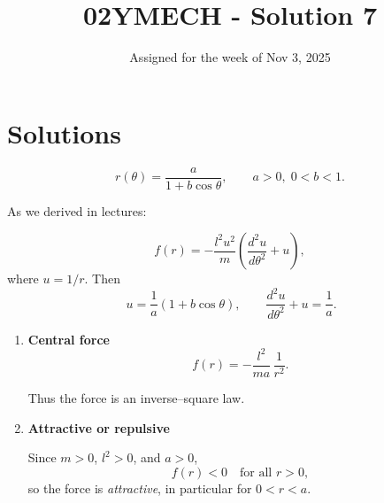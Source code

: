 \documentclass[12pt]{article}
\title{02YMECH - Solution 7}
\date{Assigned for the week of Nov 3, 2025}
\author{}
\begin{document}
\maketitle

\section*{Solutions}

\[
r(\theta)=\frac{a}{1+b\cos\theta}, \qquad a>0,\;0<b<1.
\]

As we derived in lectures:

\[
f(r)=-\frac{l^2u^2}{m} \!\left(\frac{d^2u}{d\theta^2}+u\right),
\]
where \(u=1/r\). Then
\[\
u=\frac{1}{a}(1+b\cos\theta),\qquad
\frac{d^2u}{d\theta^2}+u=\frac{1}{a}.
\]


\begin{enumerate}
\item \textbf{Central force}
\[
f(r)=-\frac{l^2}{ma}\,\frac{1}{r^2}.
\]

Thus the force is an inverse--square law.

\item \textbf{Attractive or repulsive}

Since \(m>0\), \(l^2>0\), and \(a>0\),
\[
f(r)<0 \quad \text{for all } r>0,
\]
so the force is \emph{attractive}, in particular for \(0<r<a\).
\end{enumerate}
\end{document}
